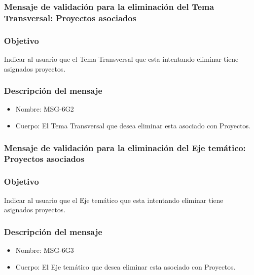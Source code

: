 
\subsubsection{Mensaje de validación para la eliminación del Tema Transversal: Proyectos asociados} \label{MSG-6G2}
 
 \subsubsection{Objetivo}
 Indicar al usuario que el Tema Transversal que esta intentando eliminar tiene asignados proyectos.

 \subsubsection{Descripción del mensaje}
 \begin{itemize}
 \item Nombre: MSG-6G2
 \item Cuerpo: El Tema Transversal que desea eliminar esta asociado con Proyectos.
 \end{itemize}


\subsubsection{Mensaje de validación para la eliminación del Eje temático: Proyectos asociados} \label{MSG-6G3}
 
 \subsubsection{Objetivo}
 Indicar al usuario que el Eje temático que esta intentando eliminar tiene asignados proyectos.

 \subsubsection{Descripción del mensaje}
 \begin{itemize}
 \item Nombre: MSG-6G3
 \item Cuerpo: El Eje temático que desea eliminar esta asociado con Proyectos.
 \end{itemize}

